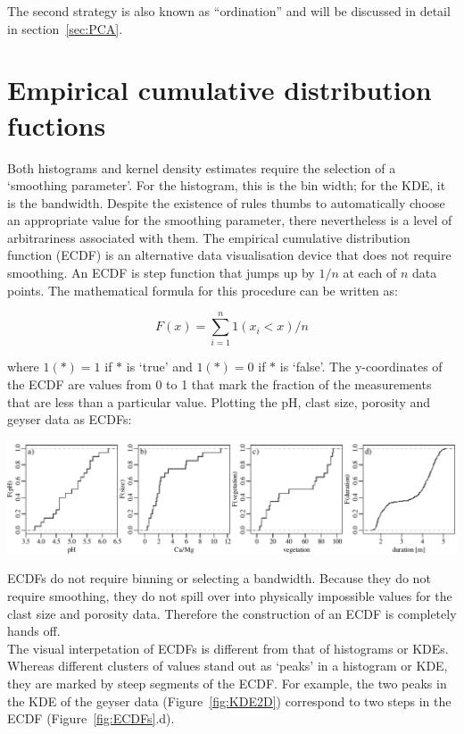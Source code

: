 The second strategy is also known as ``ordination'' and will be
discussed in detail in section~\ref{sec:PCA}.

\section{Empirical cumulative distribution fuctions}
\label{sec:ECDF}

Both histograms and kernel density estimates require the selection of
a `smoothing parameter'. For the histogram, this is the bin width; for
the KDE, it is the bandwidth. Despite the existence of rules thumbs to
automatically choose an appropriate value for the smoothing parameter,
there nevertheless is a level of arbitrariness associated with
them. The empirical cumulative distribution function (ECDF) is an
alternative data visualisation device that does not require
smoothing. An ECDF is step function that jumps up by $1/n$ at each of
$n$ data points.  The mathematical formula for this procedure can be
written as:
  
  \begin{equation}
    F(x) = \sum\limits_{i=1}^{n} 1(x_i<x)/n
    \label{eq:ECDF}
  \end{equation}
 
\noindent where $1(\ast) = 1$ if $\ast$ is `true' and $1(\ast) = 0$ if
$\ast$ is `false'. The y-coordinates of the ECDF are values from 0 to
1 that mark the fraction of the measurements that are less than a
particular value.  Plotting the pH, clast size, porosity and geyser
data as ECDFs:

\noindent\includegraphics[width=\textwidth]{../figures/ECDFs.pdf}
\begingroup
{}
\label{fig:ECDFs}
\endgroup

ECDFs do not require binning or selecting a bandwidth.  Because they
do not require smoothing, they do not spill over into physically
impossible values for the clast size and porosity data. Therefore the
construction of an ECDF is completely hands off.\\

The visual interpetation of ECDFs is different from that of histograms
or KDEs. Whereas different clusters of values stand out as `peaks' in
a histogram or KDE, they are marked by steep segments of the ECDF. For
example, the two peaks in the KDE of the geyser data
(Figure~\ref{fig:KDE2D}) correspond to two steps in the ECDF
(Figure~\ref{fig:ECDFs}.d).
